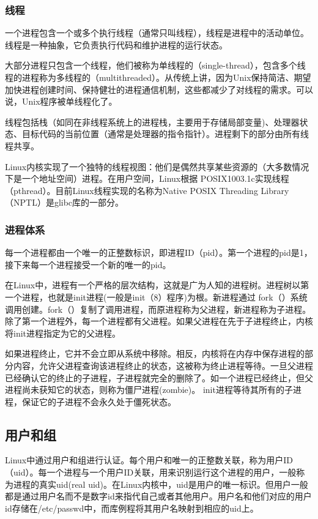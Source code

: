 \subsubsection{线程}

一个进程包含一个或多个执行线程（通常只叫线程），线程是进程中的活动单位。线程是一种抽象，它负责执行代码和维护进程的运行状态。

大部分进程只包含一个线程，他们被称为单线程的（single-thread），包含多个线程的进程称为多线程的（multithreaded）。从传统上讲，因为Unix保持简洁、期望加快进程创建时间、保持健壮的进程通信机制，这些都减少了对线程的需求。可以说，Unix程序被单线程化了。

线程包括栈（如同在非线程系统上的进程栈，主要用于存储局部变量)、处理器状态、目标代码的当前位置（通常是处理器的指令指针）。进程剩下的部分由所有线程共享。

Linux内核实现了一个独特的线程视图：他们是偶然共享某些资源的（大多数情况下是一个地址空间）进程。在用户空间，Linux根据 POSIX1003.1c实现线程（pthread）。目前Linux线程实现的名称为Native POSIX Threading Library（NPTL）是glibc库的一部分。

\subsubsection{进程体系}

每一个进程都由一个唯一的正整数标识，即进程ID（pid）。第一个进程的pid是1，接下来每一个进程接受一个新的唯一的pid。

在Linux中，进程有一个严格的层次结构，这就是广为人知的进程树。进程树以第一个进程，也就是init进程(一般是init（8）程序)为根。新进程通过 fork（）系统调用创建。fork（）复制了调用进程，而原进程称为父进程，新进程称为子进程。除了第一个进程外，每一个进程都有父进程。如果父进程在先于子进程终止，内核将init进程指定为它的父进程。

如果进程终止，它并不会立即从系统中移除。相反，内核将在内存中保存进程的部分内容，允许父进程查询该进程终止的状态，这被称为终止进程等待。一旦父进程已经确认它的终止的子进程，子进程就完全的删除了。如一个进程已经终止，但父进程尚未获知它的状态，则称为僵尸进程(zombie)。 init进程等待其所有的子进程，保证它的子进程不会永久处于僵死状态。

\subsection{用户和组}

Linux中通过用户和组进行认证。每个用户和唯一的正整数关联，称为用户ID（uid）。每一个进程与一个用户ID关联，用来识别运行这个进程的用户，一般称为进程的真实uid(real uid)。在Linux内核中，uid是用户的唯一标识。但用户一般都是通过用户名而不是数字id来指代自己或者其他用户。用户名和他们对应的用户id存储在/etc/passwd中，而库例程将其用户名映射到相应的uid上。

